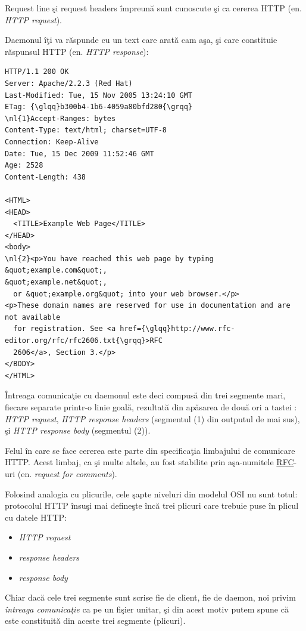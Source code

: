 Request line şi request headers împreună sunt cunoscute şi ca cererea HTTP (en.
\textsl{HTTP request}).
	
Daemonul îţi va răspunde cu un text care arată cam aşa, şi care constituie răspunsul
HTTP (en. \textsl{HTTP response}):
\begin{Verbatim}[commandchars=\\\{\}]
HTTP/1.1 200 OK
Server: Apache/2.2.3 (Red Hat)
Last-Modified: Tue, 15 Nov 2005 13:24:10 GMT
ETag: {\glqq}b300b4-1b6-4059a80bfd280{\grqq}            
\nl{1}Accept-Ranges: bytes                        
Content-Type: text/html; charset=UTF-8      
Connection: Keep-Alive                      
Date: Tue, 15 Dec 2009 11:52:46 GMT         
Age: 2528                                   
Content-Length: 438

<HTML>
<HEAD>
  <TITLE>Example Web Page</TITLE>
</HEAD>                          
<body>                           
\nl{2}<p>You have reached this web page by typing &quot;example.com&quot;,
&quot;example.net&quot;,                                            
  or &quot;example.org&quot; into your web browser.</p>             
<p>These domain names are reserved for use in documentation and are not available 
  for registration. See <a href={\glqq}http://www.rfc-editor.org/rfc/rfc2606.txt{\grqq}>RFC   
  2606</a>, Section 3.</p>                                                        
</BODY>                                                                           
</HTML>
\end{Verbatim}
Întreaga comunicaţie cu daemonul este deci compusă din trei segmente mari, fiecare separate
printr-o linie goală, rezultată din apăsarea de două ori a tastei :
\textsl{HTTP request}, \textsl{HTTP response headers} (segmentul (1) din outputul de mai sus),
şi \textsl{HTTP response body} (segmentul (2)).

Felul în care se face cererea este parte din specificaţia
limbajului de comunicare HTTP. Acest limbaj, ca şi multe altele, au fost stabilite
prin aşa-numitele \href{http://en.wikipedia.org/wiki/Request_for_Comments}{RFC}-uri
(en. \textsl{request for comments}).

Folosind analogia cu plicurile, cele şapte niveluri din modelul OSI nu sunt totul:
protocolul HTTP însuşi mai defineşte încă trei plicuri care trebuie puse în
{\glqq}plicul{\grqq} cu datele HTTP:
\begin{itemize}
\item \textsl{HTTP request}
\item \textsl{response headers}
\item \textsl{response body}
\end{itemize}
Chiar dacă cele trei {\glqq}segmente{\grqq} sunt scrise fie de client, fie de daemon,
noi privim \textit{întreaga comunicaţie} ca pe un fişier unitar, şi din acest motiv
putem spune că este constituită din aceste trei segmente ({\glqq}plicuri{\grqq}).

